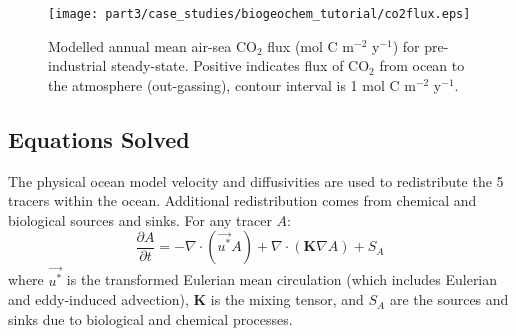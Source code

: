 \begin{figure} [tpb]
\begin{center}
\texttt{[image: part3/case\_studies/biogeochem\_tutorial/co2flux.eps]}
\caption{Modelled annual  mean air-sea CO$_2$ flux (mol C m$^{-2}$ y$^{-1}$)
for pre-industrial steady-state. Positive indicates  flux of CO$_2$
from ocean to the atmosphere (out-gassing),
contour interval is 1 mol C m$^{-2}$ y$^{-1}$.}
\label{lFcarflux}
\end{center}
\end{figure}


\subsection{Equations Solved}

The physical ocean model velocity and diffusivities are used to
redistribute the 5 tracers within the ocean. Additional redistribution
comes from chemical and biological sources and sinks.  For any tracer
$A$:
\begin{equation}
  \frac{\partial A}{\partial t}=-\nabla \cdot (\vec{u^{*}} A)+\nabla \cdot
  (\mathbf{K}\nabla A)+S_A \nonumber \label{lEtrac}
\end{equation}
where $\vec{u^{*}}$ is the transformed Eulerian mean circulation
(which includes Eulerian and eddy-induced advection), $\mathbf{K}$ is
the mixing tensor, and $S_A$ are the sources and sinks due to
biological and chemical processes.

